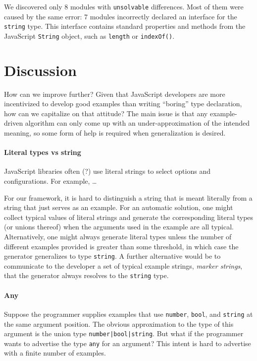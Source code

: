 \documentclass[english,cleveref,autoref,submission]{programming}
\begin{document}
We discovered only 8 modules with \texttt{unsolvable} differences. Most of them were
caused by the same error: 7 modules incorrectly declared an interface for the
\texttt{string} type. This interface contains standard properties and methods from the
JavaScript \texttt{String} object, such as \texttt{length} or \texttt{indexOf()}.

\section{Discussion}
\label{sec:discussion}

How can we improve further? Given that JavaScript developers are more incentivized to develop good
examples than writing ``boring'' type declaration, how can we capitalize on that attitude?
The main issue is that any example-driven algorithm can only come up with an
under-approximation of the intended meaning, so some form of help is required when
generalization is desired.

\paragraph*{Literal types vs string}
JavaScript libraries often (?) use literal strings to select
options and configurations. For example, \dots

For our framework, it is hard to distinguish a string that is meant literally from a
string that just serves as an example. For an automatic solution, one might collect
typical values of literal strings and generate the corresponding literal types (or
unions thereof) when the arguments used in the example are all typical. Alternatively, one
might always generate literal types unless the number of different examples provided is
greater than some threshold, in which case the generator generalizes to type
\lstinline/string/. A further alternative would be to communicate to the developer a set
of typical example strings, \emph{marker strings}, that the generator always resolves to the \lstinline/string/
type.

\paragraph*{Any}
Suppose the programmer supplies examples that use \lstinline/number/, \lstinline/bool/, and
\lstinline/string/ at the same argument position. The obvious approximation to the type of
this argument is the union type \lstinline/number|bool|string/. But what if the programmer
wants to advertise the type \lstinline/any/ for an argument? This intent is hard to
advertise with a finite number of examples.
\end{document}
